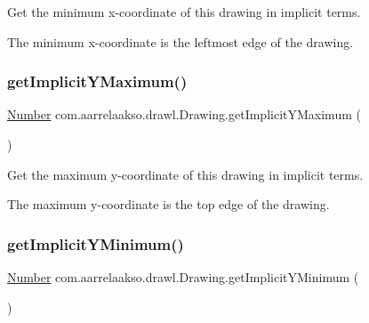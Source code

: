 Get the minimum x-\/coordinate of this drawing in implicit terms. 

The minimum x-\/coordinate is the leftmost edge of the drawing. \mbox{\label{classcom_1_1aarrelaakso_1_1drawl_1_1_drawing_a604c7e5fd692a279380aa2cd8c47a9bc}} 
\subsubsection{\texorpdfstring{get\+Implicit\+Y\+Maximum()}{getImplicitYMaximum()}}
{\footnotesize\ttfamily \hyperlink{interfacecom_1_1aarrelaakso_1_1drawl_1_1_number}{Number} com.\+aarrelaakso.\+drawl.\+Drawing.\+get\+Implicit\+Y\+Maximum (\begin{DoxyParamCaption}{ }\end{DoxyParamCaption})\hspace{0.3cm}{\ttfamily [private]}}



Get the maximum y-\/coordinate of this drawing in implicit terms. 

The maximum y-\/coordinate is the top edge of the drawing. \mbox{\label{classcom_1_1aarrelaakso_1_1drawl_1_1_drawing_a6bd98f6bb8616668329f07705f8f3689}} 
\subsubsection{\texorpdfstring{get\+Implicit\+Y\+Minimum()}{getImplicitYMinimum()}}
{\footnotesize\ttfamily \hyperlink{interfacecom_1_1aarrelaakso_1_1drawl_1_1_number}{Number} com.\+aarrelaakso.\+drawl.\+Drawing.\+get\+Implicit\+Y\+Minimum (\begin{DoxyParamCaption}{ }\end{DoxyParamCaption})\hspace{0.3cm}{\ttfamily [private]}}



